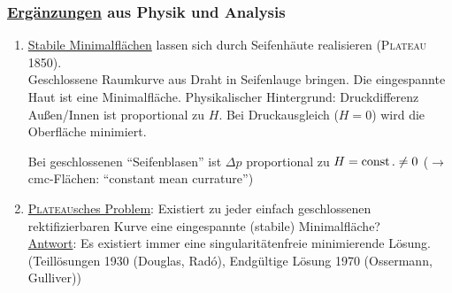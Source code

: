 \subsubsection{\uline{Ergänzungen} aus Physik und Analysis}
\begin{enumerate}
 \item \uline{Stabile Minimalflächen} lassen sich durch Seifenhäute realisieren (\textsc{Plateau} 1850). \\
 Geschlossene Raumkurve aus Draht in Seifenlauge bringen. Die eingespannte Haut ist eine Minimalfläche. Physikalischer Hintergrund: Druckdifferenz Außen/Innen ist proportional zu \(H\). Bei Druckausgleich (\(H = 0\)) wird die Oberfläche minimiert.
 \begin{bemerkung}
  Bei geschlossenen ``Seifenblasen'' ist \(\Delta p\) proportional zu \(H = \operatorname{const}. \ne 0\) (\(\to\) cmc-Flächen: ``constant mean currature'')
 \end{bemerkung}
 \item \uline{\textsc{Plateau}sches Problem}: Existiert zu jeder einfach geschlossenen rektifizierbaren Kurve eine eingespannte (stabile) Minimalfläche? \\
 \uline{Antwort}: Es existiert immer eine singularitätenfreie minimierende Lösung. (Teillösungen 1930 (Douglas, Radó), Endgültige Lösung 1970 (Ossermann, Gulliver))
\end{enumerate}

